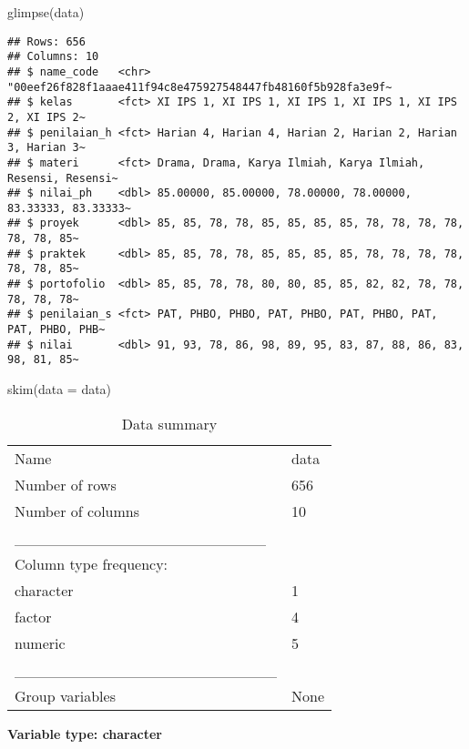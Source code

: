 \documentclass[
]{article}
\newenvironment{Shaded}{\begin{snugshade}}{\end{snugshade}}
\newcommand{\AttributeTok}[1]{\textcolor[rgb]{0.77,0.63,0.00}{#1}}
\newcommand{\FunctionTok}[1]{\textcolor[rgb]{0.00,0.00,0.00}{#1}}
\newcommand{\NormalTok}[1]{#1}
\begin{document}
\begin{Shaded}
\begin{Highlighting}[]
\FunctionTok{glimpse}\NormalTok{(data)}
\end{Highlighting}
\end{Shaded}

\begin{verbatim}
## Rows: 656
## Columns: 10
## $ name_code   <chr> "00eef26f828f1aaae411f94c8e475927548447fb48160f5b928fa3e9f~
## $ kelas       <fct> XI IPS 1, XI IPS 1, XI IPS 1, XI IPS 1, XI IPS 2, XI IPS 2~
## $ penilaian_h <fct> Harian 4, Harian 4, Harian 2, Harian 2, Harian 3, Harian 3~
## $ materi      <fct> Drama, Drama, Karya Ilmiah, Karya Ilmiah, Resensi, Resensi~
## $ nilai_ph    <dbl> 85.00000, 85.00000, 78.00000, 78.00000, 83.33333, 83.33333~
## $ proyek      <dbl> 85, 85, 78, 78, 85, 85, 85, 85, 78, 78, 78, 78, 78, 78, 85~
## $ praktek     <dbl> 85, 85, 78, 78, 85, 85, 85, 85, 78, 78, 78, 78, 78, 78, 85~
## $ portofolio  <dbl> 85, 85, 78, 78, 80, 80, 85, 85, 82, 82, 78, 78, 78, 78, 78~
## $ penilaian_s <fct> PAT, PHBO, PHBO, PAT, PHBO, PAT, PHBO, PAT, PAT, PHBO, PHB~
## $ nilai       <dbl> 91, 93, 78, 86, 98, 89, 95, 83, 87, 88, 86, 83, 98, 81, 85~
\end{verbatim}

\begin{Shaded}
\begin{Highlighting}[]
\FunctionTok{skim}\NormalTok{(}\AttributeTok{data =}\NormalTok{ data)}
\end{Highlighting}
\end{Shaded}

\begin{longtable}[]{@{}ll@{}}
\caption{Data summary}\tabularnewline
\toprule()
\endhead
Name & data \\
Number of rows & 656 \\
Number of columns & 10 \\
\_\_\_\_\_\_\_\_\_\_\_\_\_\_\_\_\_\_\_\_\_\_\_ & \\
Column type frequency: & \\
character & 1 \\
factor & 4 \\
numeric & 5 \\
\_\_\_\_\_\_\_\_\_\_\_\_\_\_\_\_\_\_\_\_\_\_\_\_ & \\
Group variables & None \\
\bottomrule()
\end{longtable}

\textbf{Variable type: character}
\end{document}
